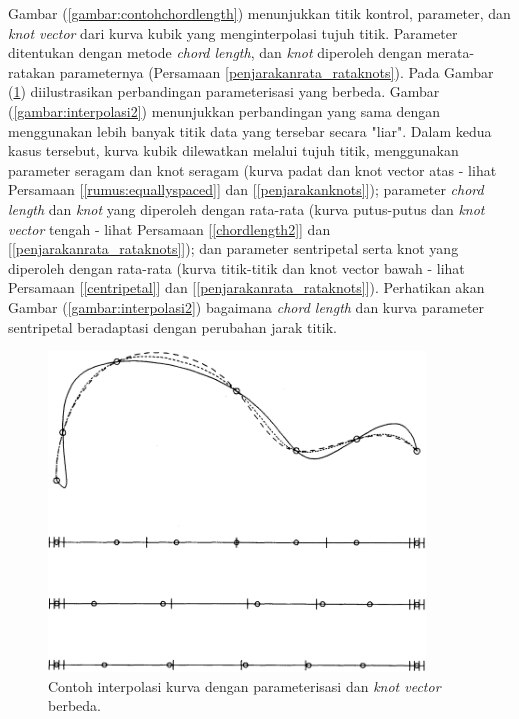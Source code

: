 Gambar (\ref{gambar:contohchordlength}) menunjukkan titik kontrol, parameter, 
dan \textit{knot vector} dari kurva kubik yang menginterpolasi 
tujuh titik. Parameter ditentukan dengan metode 
\textit{chord length}, dan \textit{knot} diperoleh 
dengan merata-ratakan parameternya (Persamaan \ref{penjarakanrata_rataknots}). 
Pada Gambar (\ref{gambar:interpolasi1}) diilustrasikan perbandingan 
parameterisasi yang berbeda. Gambar 
(\ref{gambar:interpolasi2}) menunjukkan 
perbandingan yang sama dengan menggunakan lebih banyak 
titik data yang tersebar secara "liar". Dalam kedua 
kasus tersebut, kurva kubik dilewatkan melalui tujuh 
titik, menggunakan parameter seragam dan knot seragam 
(kurva padat dan knot vector atas - lihat Persamaan 
[\ref{rumus:equallyspaced}] dan [\ref{penjarakanknots}]); 
parameter \textit{chord length} dan \textit{knot} yang diperoleh 
dengan rata-rata (kurva putus-putus dan \textit{knot vector} 
tengah - lihat Persamaan [\ref{chordlength2}] dan 
[\ref{penjarakanrata_rataknots}]); dan parameter 
sentripetal serta knot yang diperoleh dengan 
rata-rata (kurva titik-titik dan knot vector 
bawah - lihat Persamaan [\ref{centripetal}] dan 
[\ref{penjarakanrata_rataknots}]). Perhatikan akan 
Gambar (\ref{gambar:interpolasi2}) bagaimana 
\textit{chord length} dan kurva 
parameter sentripetal beradaptasi dengan perubahan 
jarak titik.

\begin{figure}[H]
	\centering
	\includegraphics[keepaspectratio, width=10cm]{gambar/Interpolasi/pic6.png}
	\caption{Contoh interpolasi kurva dengan 
	parameterisasi dan \textit{knot vector}  berbeda.}
	\label{gambar:interpolasi1}
\end{figure}

